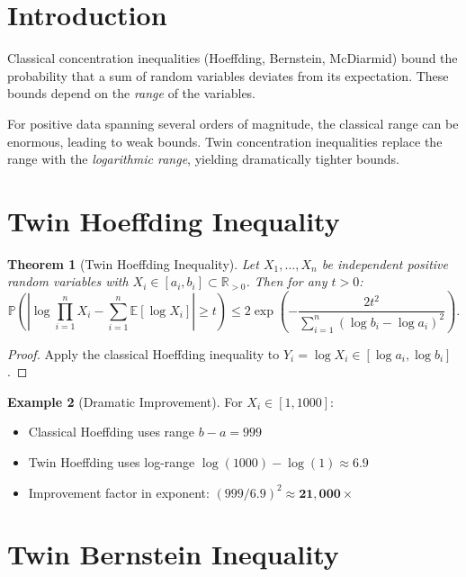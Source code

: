 \documentclass[11pt,twoside,openright]{book}
\theoremstyle{plain}
\newtheorem{theorem}{Theorem}[chapter]
\theoremstyle{definition}
\newtheorem{example}[theorem]{Example}
\theoremstyle{remark}
\newcommand{\Rd}{\mathbb{R}}
\newcommand{\abs}[1]{|#1|}
\newcommand{\E}{\mathbb{E}}
\newcommand{\Prob}{\mathbb{P}}
\begin{document}
\section{Introduction}

Classical concentration inequalities (Hoeffding, Bernstein, McDiarmid) bound the probability that a sum of random variables deviates from its expectation. These bounds depend on the \emph{range} of the variables.

For positive data spanning several orders of magnitude, the classical range can be enormous, leading to weak bounds. Twin concentration inequalities replace the range with the \emph{logarithmic range}, yielding dramatically tighter bounds.

\section{Twin Hoeffding Inequality}

\begin{theorem}[Twin Hoeffding Inequality]
\label{thm:twin-hoeffding}
Let $X_1, \ldots, X_n$ be independent positive random variables with $X_i \in [a_i, b_i] \subset \Rd_{>0}$. Then for any $t > 0$:
\begin{equation}
\Prob\left(\abs{\log\prod_{i=1}^n X_i - \sum_{i=1}^n \E[\log X_i]} \geq t\right) \leq 2\exp\left(-\frac{2t^2}{\sum_{i=1}^n (\log b_i - \log a_i)^2}\right).
\label{eq:twin-hoeffding}
\end{equation}
\end{theorem}

\begin{proof}
Apply the classical Hoeffding inequality to $Y_i = \log X_i \in [\log a_i, \log b_i]$.
\end{proof}

\begin{example}[Dramatic Improvement]
For $X_i \in [1, 1000]$:
\begin{itemize}
\item Classical Hoeffding uses range $b - a = 999$
\item Twin Hoeffding uses log-range $\log(1000) - \log(1) \approx 6.9$
\item Improvement factor in exponent: $(999/6.9)^2 \approx \mathbf{21{,}000\times}$
\end{itemize}
\end{example}

\section{Twin Bernstein Inequality}
\end{document}
